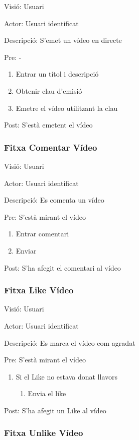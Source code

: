 \documentclass[12pt, titlepage]{article}
\begin{document}
Visió: Usuari

Actor: Usuari identificat

Descripció: S'emet un vídeo en directe

Pre: -

\begin{enumerate}
\item Entrar un títol i descripció
\item Obtenir clau d'emisió
\item Emetre el vídeo utilitzant la clau
\end{enumerate}

Post: S’està emetent el vídeo

\subsubsection{Fitxa Comentar Vídeo}

Visió: Usuari

Actor: Usuari identificat

Descripció: Es comenta un vídeo

Pre: S’està mirant el vídeo

\begin{enumerate}
\item Entrar comentari
\item Enviar
\end{enumerate}

Post: S’ha afegit el comentari al vídeo

\subsubsection{Fitxa Like Vídeo}

Visió: Usuari

Actor: Usuari identificat

Descripció: Es marca el vídeo com agradat

Pre: S’està mirant el vídeo

\begin{enumerate}
\item Si el Like no estava donat llavors
\begin{enumerate}
\item Envia el like
\end{enumerate}
\end{enumerate}
Post: S’ha afegit un Like al vídeo


\subsubsection{Fitxa Unlike Vídeo}
\end{document}
